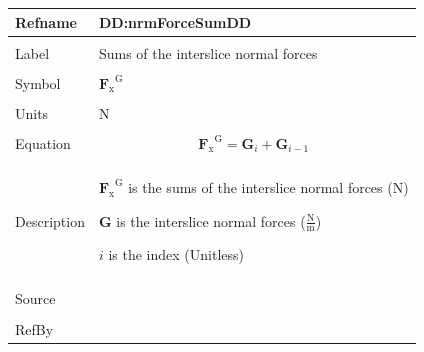 \documentclass[12pt]{article}
\begin{document}
\noindent \begin{minipage}{\textwidth}
\begin{tabular}{>{\raggedright}p{}>{\raggedright\arraybackslash}p{}}
\toprule \textbf{Refname} & \textbf{DD:nrmForceSumDD}
\label{DD:nrmForceSumDD}
\\ \midrule \\
Label & Sums of the interslice normal forces
\\ \midrule \\
Symbol & ${{\mathbf{F}_{\text{x}}}^{\text{G}}}$
\\ \midrule \\
Units & N
\\ \midrule \\
Equation & \begin{displaymath}
           {{\mathbf{F}_{\text{x}}}^{\text{G}}}={\mathbf{G}}_{i}+{\mathbf{G}}_{i-1}
           \end{displaymath}
\\ \midrule \\
Description & \begin{symbDescription}
              \item{${{\mathbf{F}_{\text{x}}}^{\text{G}}}$ is the sums of the interslice normal forces (N)}
              \item{$\mathbf{G}$ is the interslice normal forces ($\frac{\text{N}}{\text{m}}$)}
              \item{$i$ is the index (Unitless)}
              \end{symbDescription}
\\ \midrule \\
Source & \cite{fredlund1977}
\\ \midrule \\
RefBy & 
\\ \bottomrule
\end{tabular}
\end{minipage}
\par~
\end{document}
